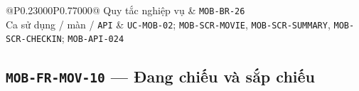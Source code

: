 \begin{longtable}{@{}P{0.23000\SRSWidth}P{0.77000\SRSWidth}@{}}
Quy tắc nghiệp vụ & \texttt{MOB-\allowbreak{}BR-\allowbreak{}26} \\[3pt]
Ca sử dụng /\allowbreak{} màn /\allowbreak{} \texttt{API} & \texttt{UC-\allowbreak{}MOB-\allowbreak{}02}; \texttt{MOB-\allowbreak{}SCR-\allowbreak{}MOVIE}, \texttt{MOB-\allowbreak{}SCR-\allowbreak{}SUMMARY}, \texttt{MOB-\allowbreak{}SCR-\allowbreak{}CHECKIN}; \texttt{MOB-\allowbreak{}API-\allowbreak{}024} \\[3pt]
\end{longtable}
\endgroup

\subsection{\texttt{MOB-\allowbreak{}FR-\allowbreak{}MOV-\allowbreak{}10} — Đang chiếu và sắp chiếu}
\begingroup
\fontsize{9.5}{12}\selectfont
\setlength{\SRSWidth}{\dimexpr\linewidth-2\tabcolsep\relax}
